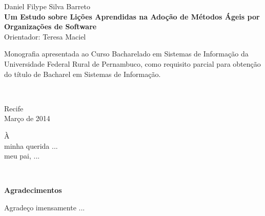 %
\hyphenation{}

\vspace*{0.0cm}
{\center
{\Large Daniel Filype Silva Barreto}\\[2.4cm]
{\huge \bf Um Estudo sobre Lições Aprendidas na Adoção de Métodos Ágeis por Organizações de Software}\\[2.0cm]
{\Large Orientador: Teresa Maciel}}\\[2.0cm]

{\raggedleft
\begin{minipage}[t]{8.3cm}
\setlength{\baselineskip}{0.25in}
Monografia apresentada ao Curso Bacharelado em Sistemas de Informação  da Universidade Federal Rural de Pernambuco, como requisito parcial para obtenção do título de Bacharel em Sistemas de Informação.\end{minipage}\\[2cm]}
\vspace{3cm}
{\center Recife \\[3mm]
Março de 2014 \\}

\newpage
\vspace*{18cm}
{\raggedleft
\begin{minipage}[t]{6.0cm}
\setlength{\baselineskip}{0.25in}
À\\
minha querida ...\\
meu pai, ...\\
\end{minipage}\\[2cm]}



\newpage
\begin{center}
{\Large \bf Agradecimentos}
\end{center}
\vspace*{-0.06in}

Agradeço imensamente ...


